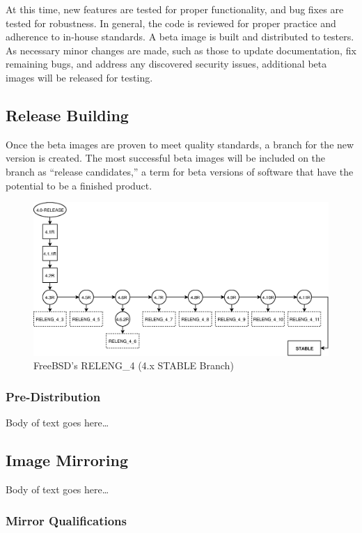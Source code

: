 \documentclass[conference]{IEEEtran}
\begin{document}
At this time, new features are tested for proper functionality,
and bug fixes are tested for robustness. In general, the code
is reviewed for proper practice and adherence to in-house standards.
A beta image is built and distributed to testers.
As necessary minor changes are made, such as those to update documentation,
fix remaining bugs, and address any discovered security issues,
additional beta images will be released for testing.

\subsection{Release Building}

Once the beta images are proven to meet quality standards,
a branch for the new version is created.
The most successful beta images will be included on the branch
as ``release candidates,'' a term for beta versions of software
that have the potential to be a finished product.

\begin{figure}[h!]
\includegraphics[width=\linewidth]{./images/FreeBSD_4.eps}
\caption{FreeBSD's RELENG\_4 (4.x STABLE Branch)}
\label{FreeBSD_4}
\end{figure}

\subsubsection{Pre-Distribution}

Body of text goes here\ldots

\subsection{Image Mirroring}

Body of text goes here\ldots

\subsubsection{Mirror Qualifications}
\end{document}
